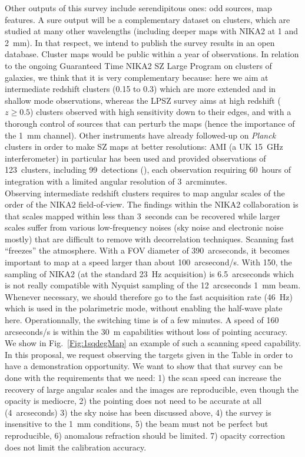 \documentclass[10pt,a4paper,twoside,graphicx,color]{article}
\begin{document}
Other outputs of this survey include serendipitous ones: odd sources,
map features. A sure output will be a complementary dataset on
clusters, which are studied at many other wavelengths (including
deeper maps with NIKA2 at 1 and 2~mm). In that respect, we intend to
publish the survey results in an open database. Cluster maps would be
public within a year of observations. In relation to the ongoing
Guaranteed Time NIKA2 SZ Large Program on clusters of galaxies, we
think that it is very complementary because: here we aim at
intermediate redshift clusters (0.15 to 0.3) which are more extended
and in shallow mode observations, whereas the LPSZ survey aims at high
redshift ($z\ge 0.5$) clusters observed with high sensitivity down to
their edges, and with a thorough control of sources that can perturb
the maps (hence the importance of the 1~mm channel). Other instruments
have already followed-up on {\sl Planck} clusters in order to make SZ
maps at better resolutions: AMI (a UK 15~GHz interferometer) in
particular has been used and provided observations of 123~clusters,
including 99~detections (\cite{Perrott2015}), each observation
requiring 60~hours of integration with a limited angular resolution of
3~arcminutes.\\

\vspace{-0.1cm}  Observing intermediate redshift clusters requires to map
angular scales of the order of the NIKA2 field-of-view. The findings
within the NIKA2 collaboration is that scales mapped within less than
3~seconds can be recovered while larger scales suffer from various
low-frequency noises (sky noise and electronic noise mostly) that are
difficult to remove with decorrelation techniques. Scanning fast
``freezes'' the atmosphere. With a FOV diameter of 390~arcseconds, it
becomes important to map at a speed larger than about
100~arcsecond/s. With 150, the sampling of NIKA2 (at the standard
23~Hz acquisition) is 6.5~arcseconds which is not really compatible
with Nyquist sampling of the 12~arcseconds 1~mm beam. Whenever
necessary, we should therefore go to the fast acquisition rate (46~Hz)
which is used in the polarimetric mode, without enabling the half-wave
plate here. Operationnally, the switching time is of a few minutes. A
speed of 160 arcseconds/s is within the 30~m capabilities without loss
of pointing accuracy. We show in Fig.~\ref{Fig:1sqdegMap} an example
of such a scanning speed capability. In this proposal, we request
observing the targets given in the Table in order to have a
demonstration opportunity. We want to show that that survey can be
done with the requirements that we need: 1) the scan speed can
increase the recovery of large angular scales and the images are
reproducible, even though the opacity is mediocre, 2) the pointing
does not need to be accurate at all (4~arcseconds) 3) the sky noise
has been discussed above, 4) the survey is insensitive to the 1~mm
conditions, 5) the beam must not be perfect but reproducible, 6)
anomalous refraction should be limited. 7) opacity correction does not
limit the calibration accuracy.\\
\end{document}
